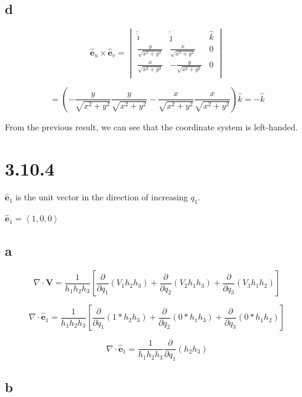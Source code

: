 \documentclass[12pt]{article}
\begin{document}
\subsection{d}

\[
    \hat{\textbf{e}}_u \times \hat{\textbf{e}}_v =
    \begin{vmatrix}
        \hat{\dot{\imath}}         & \hat{\dot{\jmath}}          & \hat{k} \\
        \frac{y}{\sqrt{x^2 + y^2}} & \frac{x}{\sqrt{x^2 + y^2}}  & 0       \\
        \frac{x}{\sqrt{x^2 + y^2}} & -\frac{y}{\sqrt{x^2 + y^2}} & 0       \\
    \end{vmatrix}
\]

\[
    = \left(
    - \frac{y}{\sqrt{x^2 + y^2}} \frac{y}{\sqrt{x^2 + y^2}}
    - \frac{x}{\sqrt{x^2 + y^2}} \frac{x}{\sqrt{x^2 + y^2}}
    \right) \hat{k} = -\hat{k}
\]

From the previous result, we can see that the coordinate system is left-handed.

\section{3.10.4}

\(\hat{\textbf{e}}_1\) is the unit vector in the direction of increasing \(q_1\).

\(\hat{\textbf{e}}_1 = \left\langle1, 0, 0\right\rangle \)

\subsection{a}

\[
    \nabla \cdot \textbf{V} = \frac{1}{h_1 h_2 h_3}
    \left[
        \frac{\partial}{\partial q_1}\left(V_1 h_2 h_3\right)
        + \frac{\partial}{\partial q_2}\left(V_2 h_1 h_3\right)
        + \frac{\partial}{\partial q_3}\left(V_3 h_1 h_2\right)
        \right]
\]

\[
    \nabla \cdot \hat{\textbf{e}}_1 = \frac{1}{h_1 h_2 h_3}
    \left[
        \frac{\partial}{\partial q_1}\left(1 * h_2 h_3\right)
        + \frac{\partial}{\partial q_2}\left(0 * h_1 h_3\right)
        + \frac{\partial}{\partial q_3}\left(0 * h_1 h_2\right)
        \right]
\]

\[
    \nabla \cdot \hat{\textbf{e}}_1 = \frac{1}{h_1 h_2 h_3} \frac{\partial}{\partial q_1}\left(h_2 h_3\right)
\]

\subsection{b}
\end{document}
